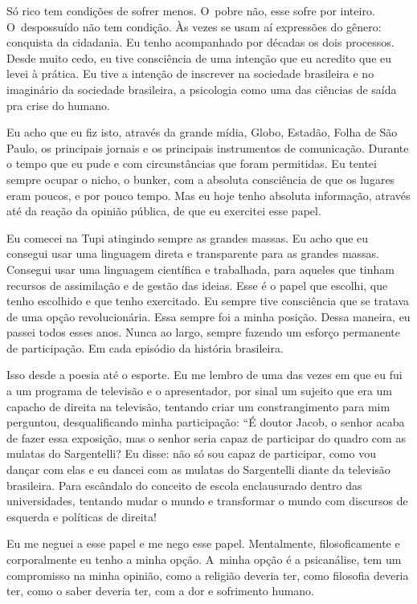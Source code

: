  

Só rico tem condições de sofrer menos. O~pobre não, esse sofre por
inteiro. O~despossuído não tem condição. Às vezes se usam aí expressões
do gênero: conquista da cidadania. Eu tenho acompanhado por décadas os
dois processos. Desde muito cedo, eu tive consciência de uma intenção
que eu acredito que eu levei à prática. Eu tive a intenção de inscrever
na sociedade brasileira e no imaginário da sociedade brasileira, a
psicologia como uma das ciências de saída pra crise do humano.

 

Eu acho que eu fiz isto, através da grande mídia,  Globo, Estadão,
Folha de São Paulo, os principais jornais e os principais instrumentos
de comunicação. Durante o tempo que eu pude e com circunstâncias que
foram permitidas. Eu tentei sempre ocupar o nicho, o bunker, com a
absoluta consciência de que os lugares eram poucos, e por pouco tempo.
Mas eu hoje tenho absoluta informação, através até da reação da opinião
pública, de que eu exercitei esse papel.

 

Eu comecei na  Tupi atingindo sempre as grandes massas. Eu acho que eu
consegui usar uma linguagem direta e transparente para as grandes
massas. Consegui usar uma linguagem científica e trabalhada, para
aqueles que tinham recursos de assimilação e de gestão das ideias. Esse
é o papel que escolhi, que tenho escolhido e que tenho exercitado. Eu
sempre tive consciência que se tratava de uma opção revolucionária. Essa
sempre foi a minha posição. Dessa maneira, eu passei todos esses anos.
Nunca ao largo, sempre fazendo um esforço permanente de participação. Em
cada episódio da história brasileira.

Isso desde a poesia até o esporte. Eu me lembro de uma das vezes em que
eu fui a um programa de televisão e o apresentador, por sinal um sujeito
que era um capacho de direita na televisão, tentando criar um
constrangimento para mim perguntou, desqualificando minha participação:
``É doutor Jacob, o senhor acaba de fazer essa exposição, mas o senhor
seria capaz de participar do quadro com as mulatas do Sargentelli? Eu
disse: não só sou capaz de participar, como vou dançar com elas e eu
dancei com as mulatas do Sargentelli diante da televisão brasileira.
Para escândalo do conceito de escola enclausurado dentro das
universidades, tentando mudar o mundo e transformar o mundo com
discursos de esquerda e políticas de direita!

Eu me neguei a esse papel e me nego esse papel. Mentalmente,
filosoficamente e corporalmente eu tenho a minha opção. A~minha opção é
a psicanálise, tem um compromisso na minha opinião, como a religião
deveria ter, como filosofia deveria ter, como o saber deveria ter, com a
dor e sofrimento humano.

